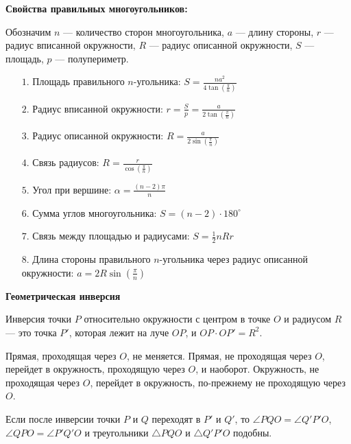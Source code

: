 \textbf{Свойства правильных многоугольников:}

Обозначим \( n \) --- количество сторон многоугольника, \( a \) --- длину стороны, \( r \) --- радиус вписанной окружности, \( R \) --- радиус описанной окружности, \( S \) --- площадь, \( p \) --- полупериметр.

\begin{itemize}
    \item[$1.$] Площадь правильного \( n \)-угольника:
    \(
    S = \frac{n a^2}{4 \tan\left(\frac{\pi}{n}\right)}
    \)
    
    \item[$2.$] Радиус вписанной окружности:
    \(
    r = \frac{S}{p} = \frac{a}{2 \tan\left(\frac{\pi}{n}\right)}
    \)

    \item[$3.$] Радиус описанной окружности:
    \(
    R = \frac{a}{2 \sin\left(\frac{\pi}{n}\right)}
    \)

    \item[$4.$] Связь радиусов:
    \(
    R = \frac{r}{\cos\left(\frac{\pi}{n}\right)}
    \)

    \item[$5.$] Угол при вершине:
    \(
    \alpha = \frac{(n-2) \pi}{n}
    \)

    \item[$6.$] Сумма углов многоугольника:
    \(
    S = (n-2) \cdot 180^\circ
    \)

    \item[$7.$] Связь между площадью и радиусами:
    \(
    S = \frac{1}{2} n R r
    \)

	\item[$8.$] Длина стороны правильного \( n \)-угольника через радиус описанной окружности:
    \(
    a = 2R \sin\left(\frac{\pi}{n}\right)
    \)
\end{itemize}

\textbf{Геометрическая инверсия}

Инверсия точки $P$ относительно окружности с центром в точке $O$ и радиусом $R$ --- это точка $P'$, которая лежит на луче $OP$, и $OP \cdot OP' = R^2$.

Прямая, проходящая через $O$, не меняется. Прямая, не проходящая через $O$, перейдет в окружность, проходящую через $O$, и наоборот. Окружность, не проходящая через $O$, перейдет в окружность, по-прежнему не проходящую через $O$.

Если после инверсии точки $P$ и $Q$ переходят в $P'$ и $Q'$, то $\angle PQO = \angle Q'P'O$, $\angle QPO = \angle P'Q'O$ и треугольники $\triangle PQO$ и $\triangle Q'P'O$ подобны.

